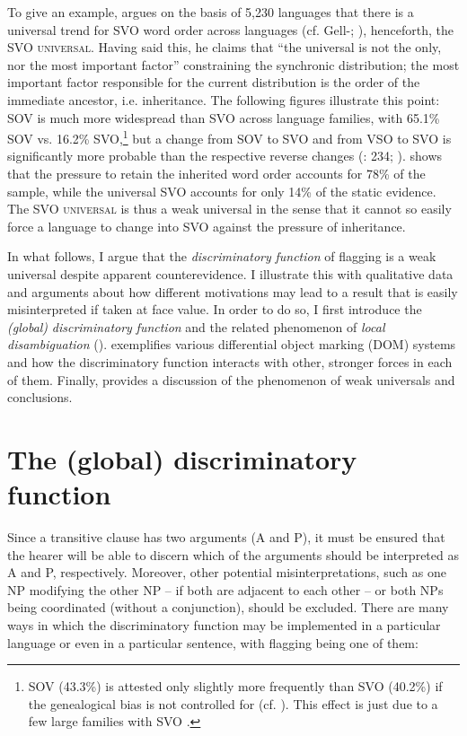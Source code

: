 \documentclass[output=paper]{langsci/langscibook}
\begin{document}
To give an example, \citet{Hammarström2015} argues on the basis of 5,230 languages that there is a universal trend for SVO word order across languages (cf. Gell-\citealt{MannRuhlen2011}; \citealt{MauritsGriffiths2014}), henceforth, the \textsc{SVO universal}. Having said this, he claims that “the universal is not the only, nor the most important factor” constraining the synchronic distribution; the most important factor responsible for the current distribution is the order of the immediate ancestor, i.e. inheritance. The following figures illustrate this point: SOV is much more widespread than SVO across language families, with 65.1\% SOV vs. 16.2\% SVO,\footnote{SOV (43.3\%) is attested only slightly more frequently than SVO (40.2\%) if the genealogical bias is not controlled for (cf. \citealt{Dryer2013}). This effect is just due to a few large families with SVO \citep{Hammarström2015}.} but a change from SOV to SVO and from VSO to SVO is significantly more probable than the respective reverse changes (\citealt{Croft2003}: 234; \citealt{MauritsGriffiths2014}). \citet{Hammarström2015} shows that the pressure to retain the inherited word order accounts for 78\% of the sample, while the universal SVO accounts for only 14\% of the static evidence. The SVO \textsc{universal} is thus a weak universal in the sense that it cannot so easily force a language to change into SVO against the pressure of inheritance.

In what follows, I argue that the \textit{discriminatory} \textit{function} of flagging is a weak universal despite apparent counterevidence. I illustrate this with qualitative data and arguments about how different motivations may lead to a result that is easily misinterpreted if taken at face value. In order to do so, I first introduce the \textit{(global)} \textit{discriminatory} \textit{function} and the related phenomenon of \textit{local} \textit{disambiguation} ().  exemplifies various differential object marking (DOM) systems and how the discriminatory function interacts with other, stronger forces in each of them. Finally,  provides a discussion of the phenomenon of weak universals and conclusions.

\section{ The (global) discriminatory function}

Since a transitive clause has two arguments (A and P), it must be ensured that the hearer will be able to discern which of the arguments should be interpreted as A and P, respectively. Moreover, other potential misinterpretations, such as one NP modifying the other NP – if both are adjacent to each other – or both NPs being coordinated (without a conjunction), should be excluded. There are many ways in which the discriminatory function may be implemented in a particular language or even in a particular sentence, with flagging being one of them: 
\end{document}
